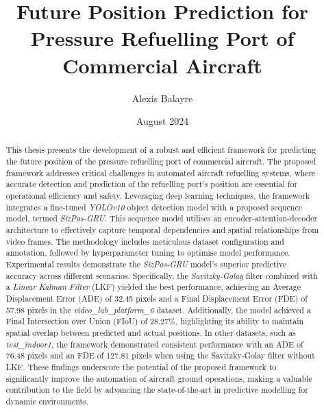 \documentclass[12pt,oneside]{book} %
\title{Future Position Prediction for Pressure Refuelling Port
    of Commercial Aircraft}
\author{Alexis Balayre}
\date{August 2024}
\begin{document}
%
%

\frontmatter

\maketitle

\begin{abstract}

    This thesis presents the development of a robust and efficient framework for
    predicting the future position of the pressure refuelling port of commercial
    aircraft. The proposed framework addresses critical challenges in automated
    aircraft refuelling systems, where accurate detection and prediction of the
    refuelling port's position are essential for operational efficiency and safety.
    Leveraging deep learning techniques, the framework integrates a fine-tuned
    \textit{YOLOv10} object detection model with a proposed sequence model, termed
    \textit{SizPos-GRU}. This sequence model utilises an encoder-attention-decoder
    architecture to effectively capture temporal dependencies and spatial
    relationships from video frames. The methodology includes meticulous dataset
    configuration and annotation, followed by hyperparameter tuning to optimise
    model performance. Experimental results demonstrate the \textit{SizPos-GRU} model's
    superior predictive accuracy across different scenarios. Specifically, the
    \textit{Savitzky-Golay} filter combined with a \textit{Linear Kalman Filter} (LKF) yielded the
    best performance, achieving an Average Displacement Error (ADE) of 32.45 pixels
    and a Final Displacement Error (FDE) of 57.98 pixels in the
    \textit{video\_lab\_platform\_6} dataset. Additionally, the model achieved a
    Final Intersection over Union (FIoU) of 28.27\%, highlighting its ability to
    maintain spatial overlap between predicted and actual positions. In other
    datasets, such as \textit{test\_indoor1}, the framework demonstrated consistent
    performance with an ADE of 76.48 pixels and an FDE of 127.81 pixels when using
    the Savitzky-Golay filter without LKF. These findings underscore the potential
    of the proposed framework to significantly improve the automation of aircraft
    ground operations, making a valuable contribution to the field by advancing the
    state-of-the-art in predictive modelling for dynamic environments.

\end{abstract}
\end{document}
